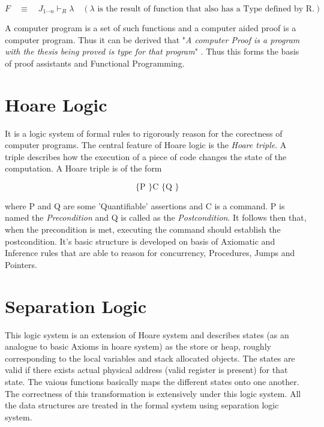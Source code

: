 \[F \quad \equiv \quad J_{1 \cdots n}\vdash_R \lambda \quad (\lambda \mbox{ is the result of function that also has a Type defined by R.}) \]

A computer program is a set of such functions and a computer aided proof is a computer program. Thus it can be derived that "\textit{A computer Proof is a program with the thesis being proved is type for that program}" . Thus this forms the basis of proof assistants and Functional Programming. 

\section{Hoare Logic}
It \cite{hoare_logic} is a logic system of formal rules to rigorously reason for the corectness of computer programs. The central feature of Hoare logic is the \textit{Hoare triple}. A triple describes how the execution of a piece of code changes the state of the computation. A Hoare triple is of the form

   \[\mbox{  \{ P \} C \{ Q \} }\]

where P and Q are some 'Quantifiable' assertions and C is a command. P is named the \textit{Precondition} and Q is called as the \textit{Postcondition}. It follows then that, when the precondition is met, executing the command should establish the postcondition. It's basic structure is developed on basis of Axiomatic and Inference rules that are able to reason for concurrency, Procedures, Jumps and Pointers.

\section{Separation Logic}
This logic system \cite{separation_logic} is an extension of Hoare system and describes states (as an analogue to basic Axioms in hoare system) as the store or heap, roughly corresponding to the local variables and stack allocated objects. The states are valid if there exists actual physical address (valid register is present) for that state. The vaious functions basically maps the different states onto one another. The correctness of this transformation is extensively under this logic system. All the data structures are treated in the formal system using separation logic system. 
